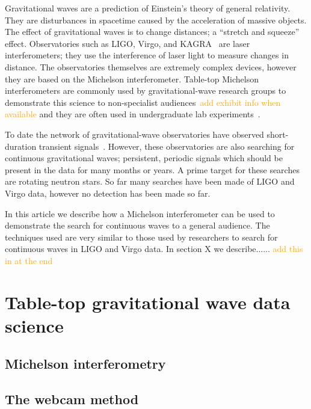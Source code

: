 \documentclass[prb,preprint]{revtex4-1}
\newcommand{\han}{\textcolor{orange}}
\begin{document}
Gravitational waves are a prediction of Einstein's theory of general relativity. 
They are disturbances in spacetime caused by the acceleration of massive objects. 
The effect of gravitational waves is to change distances; a ``stretch and squeeze'' effect. 
Observatories such as LIGO, Virgo, and KAGRA~\cite{KAGRA:2013} are laser interferometers; they use the interference of laser light to measure changes in distance. 
The observatories themselves are extremely complex devices, however they are based on the Michelson interferometer. 
Table-top Michelson interferometers are commonly used by gravitational-wave research groups to demonstrate this science to non-specialist audiences~\cite{ThorLabsIFO,NikhefIFO}\han{add exhibit info when available} and they are often used in undergraduate lab experiments~\cite{UgoliniEtAl:2019}. 


To date the network of gravitational-wave observatories have observed short-duration transient signals~\cite{GWTC-1:2018,GWOSC:online}. 
However, these observatories are also searching for continuous gravitational waves; persistent, periodic signals which should be present in the data for many months or years. 
A prime target for these searches are rotating neutron stars. 
So far many searches have been made of LIGO and Virgo data, however no detection has been made so far.


In this article we describe how a Michelson interferometer can be used to demonstrate the search for continuous waves to a general audience. 
The techniques used are very similar to those used by researchers to search for continuous waves in LIGO and Virgo data. 
In section X we describe...... \han{add this in at the end}


\section{Table-top gravitational wave data science}

\subsection{Michelson interferometry}

\subsection{The webcam method}
\end{document}

